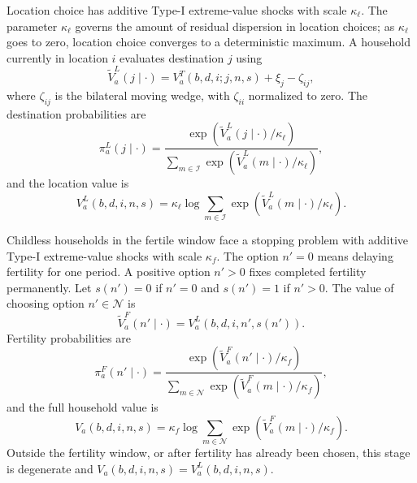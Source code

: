 \documentclass[11pt]{article}
\newcommand{\Nset}{\mathcal N}
\newcommand{\Iset}{\mathcal I}
\begin{document}
Location choice has additive Type-I extreme-value shocks with scale $\kappa_\ell$. The parameter $\kappa_\ell$ governs the amount of residual dispersion in location choices; as $\kappa_\ell$ goes to zero, location choice converges to a deterministic maximum. A household currently in location $i$ evaluates destination $j$ using
\begin{equation*}
    \widetilde V^L_a(j\mid\cdot)
    =
    V^T_a(b,d,i;j,n,s)
    +\xi_j-\zeta_{ij},
\end{equation*}
where $\zeta_{ij}$ is the bilateral moving wedge, with $\zeta_{ii}$ normalized to zero. The destination probabilities are
\begin{equation}
    \pi^L_a(j\mid\cdot)
    =
    \frac{
    \exp\left(\widetilde V^L_a(j\mid\cdot)/\kappa_\ell\right)
    }{
    \sum_{m\in\Iset}
    \exp\left(\widetilde V^L_a(m\mid\cdot)/\kappa_\ell\right)
    },
    \label{eq:loc_probs}
\end{equation}
and the location value is
\begin{equation}
    V^L_a(b,d,i,n,s)
    =
    \kappa_\ell
    \log
    \sum_{m\in\Iset}
    \exp\left(\widetilde V^L_a(m\mid\cdot)/\kappa_\ell\right).
    \label{eq:loc_iv}
\end{equation}

Childless households in the fertile window face a stopping problem with additive Type-I extreme-value shocks with scale $\kappa_f$. The option $n'=0$ means delaying fertility for one period. A positive option $n'>0$ fixes completed fertility permanently. Let $s(n')=0$ if $n'=0$ and $s(n')=1$ if $n'>0$. The value of choosing option $n'\in\Nset$ is
\begin{equation*}
    \widetilde V^F_a(n'\mid\cdot)
    =
    V^L_a(b,d,i,n',s(n')).
\end{equation*}
Fertility probabilities are
\begin{equation}
    \pi^F_a(n'\mid\cdot)
    =
    \frac{
    \exp\left(\widetilde V^F_a(n'\mid\cdot)/\kappa_f\right)
    }{
    \sum_{m\in\Nset}
    \exp\left(\widetilde V^F_a(m\mid\cdot)/\kappa_f\right)
    },
    \label{eq:fert_probs}
\end{equation}
and the full household value is
\begin{equation}
    V_a(b,d,i,n,s)
    =
    \kappa_f
    \log
    \sum_{m\in\Nset}
    \exp\left(\widetilde V^F_a(m\mid\cdot)/\kappa_f\right).
    \label{eq:fert_iv}
\end{equation}
Outside the fertility window, or after fertility has already been chosen, this stage is degenerate and $V_a(b,d,i,n,s)=V^L_a(b,d,i,n,s)$.
\end{document}
